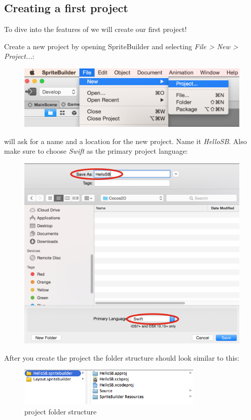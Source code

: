 \subsection{Creating a first project}
To dive into the features of \SB{} we will create our first project! 

\begin{leftbar}
Create a new project by opening SpriteBuilder and selecting \textit{File > New >
Project...}:
\begin{figure}[H]
		\centering
		\includegraphics[width=0.9\linewidth]{images/cocos2d/setup/spritebuilder_new_project.png}     
\end{figure}

\SB{} will ask for a name and a location for the new project. Name it
\textit{HelloSB}. Also make sure to choose \textit{Swift} as the primary project
language:
\begin{figure}[H]
    \centering
    \includegraphics[width=0.9\linewidth]{images/Chapter1/new_project_swift.png}     
\end{figure}
\end{leftbar}

After you create the project the folder structure should look similar
to this:
\begin{figure}[H]
		\centering
		\includegraphics[width=250pt]{images/cocos2d/setup/project_structure.png}     
		\caption{\SB{} project folder structure}
\end{figure}

